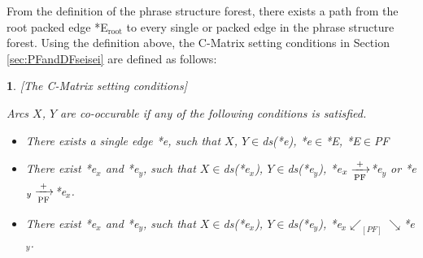 \documentclass[english]{jnlp_1.4_rep}
\theoremstyle{break}
\theoremstyle{plain}
\theoremstyle{plain}
\newtheorem{definition}{}
\begin{document}
\vspace{0.5\Cvs}
\noindent
{}
\vspace{0.5\Cvs}

\noindent
From the definition of the phrase structure forest, there
exists a path from the root packed edge *E$_\mathrm{root}$ to every single or
packed edge in the phrase structure forest. Using the definition
above, the C-Matrix setting conditions in Section
\ref{sec:PFandDFseisei} are defined as follows:

\begin{definition}\label{def:CMSetCond}[The C-Matrix setting conditions] 

Arcs $X$, $Y$ are co-occurable if any of the following conditions is satisfied.
\begin{itemize}
\item[(C1)] There exists a single edge *e, such that $X$, $Y{\in}$ds(*e), *e${\in}$*E, *E${\in}$PF
\item[(C2)] There exist *e$_x$ and *e$_y$, such that $X{\in}$ds(*e$_x$), $Y{\in}$ds(*e$_y$), *e$_x \xrightarrow[{\rm PF}]{+}$*e$_y$ or *e$_y \xrightarrow[{\rm PF}]{+}$*e$_x$.
\item[(C3)] There exist *e$_x$ and *e$_y$, such that $X{\in}$ds(*e$_x$), $Y{\in}$ds(*e$_y$), *e$_x \swarrow_{[PF]} \searrow$*e$_y$.
\end{itemize}
\end{definition}
\end{document}
